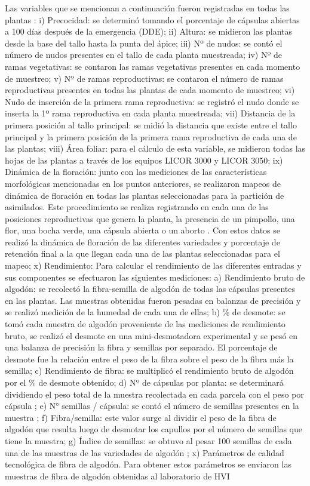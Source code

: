\documentclass[12pt,oneside]{reedthesis}
\begin{document}
Las variables que se mencionan a continuación fueron registradas en todas las plantas \autocite{kerby2010}: i) Precocidad: se determinó tomando el porcentaje de cápsulas abiertas a 100 días después de la emergencia (DDE); ii) Altura: se midieron las plantas desde la base del tallo hasta la punta del ápice; iii) Nº de nudos: se contó el número de nudos presentes en el tallo de cada planta muestreada; iv) Nº de ramas vegetativas: se contaron las ramas vegetativas presentes en cada momento de muestreo; v) Nº de ramas reproductivas: se contaron el número de ramas reproductivas presentes en todas las plantas de cada momento de muestreo; vi) Nudo de inserción de la primera rama reproductiva: se registró el nudo donde se inserta la 1º rama reproductiva en cada planta muestreada; vii) Distancia de la primera posición al tallo principal: se midió la distancia que existe entre el tallo principal y la primera posición de la primera rama reproductiva de cada una de las plantas; viii) Área foliar: para el cálculo de esta variable, se midieron todas las hojas de las plantas a través de los equipos LICOR 3000 y LICOR 3050; ix) Dinámica de la floración: junto con las mediciones de las características morfológicas mencionadas en los puntos anteriores, se realizaron mapeos de dinámica de floración en todas las plantas seleccionadas para la partición de asimilados. Este procedimiento se realiza registrando en cada una de las posiciones reproductivas que genera la planta, la presencia de un pimpollo, una flor, una bocha verde, una cápsula abierta o un aborto \autocite{kerby1996monitoring}. Con estos datos se realizó la dinámica de floración de las diferentes variedades y porcentaje de retención final a la que llegan cada una de las plantas seleccionadas para el mapeo; x) Rendimiento: Para calcular el rendimiento de las diferentes entradas y sus componentes se efectuaron las siguientes mediciones: a) Rendimiento bruto de algodón: se recolectó la fibra-semilla de algodón de todas las cápsulas presentes en las plantas. Las muestras obtenidas fueron pesadas en balanzas de precisión y se realizó medición de la humedad de cada una de ellas; b) \% de desmote: se tomó cada muestra de algodón proveniente de las mediciones de rendimiento bruto, se realizó el desmote en una mini-desmotadora experimental y se pesó en una balanza de precisión la fibra y semillas por separado. El porcentaje de desmote fue la relación entre el peso de la fibra sobre el peso de la fibra más la semilla; c) Rendimiento de fibra: se multiplicó el rendimiento bruto de algodón por el \% de desmote obtenido; d) Nº de cápsulas por planta: se determinará dividiendo el peso total de la muestra recolectada en cada parcela con el peso por cápsula \autocite{wells1984}; e) N° semillas / cápsula: se contó el número de semillas presentes en la muestra \autocite{worley1974}; f) Fibra/semilla: este valor surge al dividir el peso de la fibra de algodón que resulta luego de desmotar los capullos por el número de semillas que tiene la muestra; g) Índice de semillas: se obtuvo al pesar 100 semillas de cada una de las muestras de las variedades de algodón \autocite{pettigrew2013}; x) Parámetros de calidad tecnológica de fibra de algodón. Para obtener estos parámetros se enviaron las muestras de fibra de algodón obtenidas al laboratorio de HVI 
\end{document}
